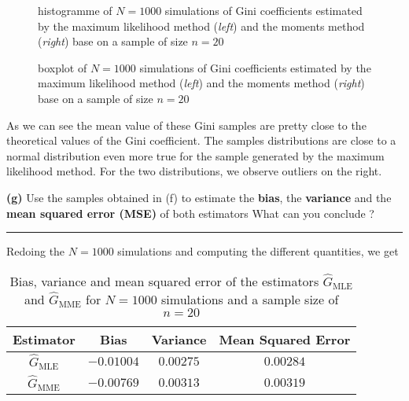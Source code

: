 \documentclass[10pt, a4paper, nofootinbib]{scrartcl}
\begin{document}
\begin{figure}[H]
  \centering
  
  \caption{histogramme of $N = 1000$ simulations of Gini coefficients estimated by the maximum likelihood method (\textit{left}) and the moments method (\textit{right}) base on a sample of size $n = 20$}
  \label{fig:gini-histogram-N=1000}
\end{figure}

\begin{figure}[H]
  \centering
  
  \caption{boxplot of $N = 1000$ simulations of Gini coefficients estimated by the maximum likelihood method (\textit{left}) and the moments method (\textit{right}) base on a sample of size $n = 20$}
  \label{fig:gini-boxplot-N=1000}
\end{figure}

As we can see the mean value of these Gini samples are pretty close to the theoretical values of the Gini coefficient. The samples distributions are close to a normal distribution even more true for the sample generated by the maximum likelihood method. For the two distributions, we observe outliers on the right.


\textbf{(g)} Use the samples obtained in (f) to estimate the \textbf{bias}, the \textbf{variance} and the \textbf{mean squared error (MSE)} of both estimators What can you conclude ?

\begin{center}\rule{6cm}{0.4pt}\end{center}

Redoing the $N = 1000$ simulations and computing the different quantities, we get

\begin{table}[H]
  \centering
  \begin{tabular}{cccc} \toprule
    Estimator                      & Bias                     & Variance               & Mean Squared Error \\\hline
    $\hat{G}_{\text{MLE}}$         & $-0.01004$    & $0.00275$  & $0.00284$ \\
    $\hat{G}_{\text{MME}}$         & $-0.00769$   & $0.00313$   & $0.00319$ \\\hline       
  \end{tabular}
  \caption{Bias, variance and mean squared error of the estimators $\hat{G}_{\text{MLE}}$ and $\hat{G}_{\text{MME}}$ for $N = 1000$ simulations and a sample size of $n = 20$}
  \label{tab:gini_estimator_statistical_quantities}
\end{table}
\end{document}
